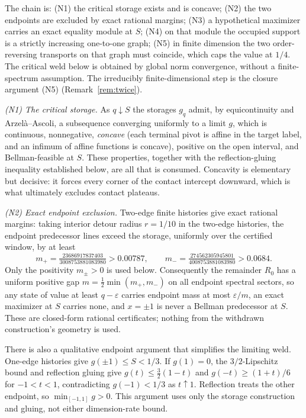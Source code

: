\documentclass[11pt]{article}
\theoremstyle{remark}
\begin{document}
The chain is: (N1) the critical storage exists and is concave; (N2) the two
endpoints are excluded by exact rational margins; (N3) a hypothetical
maximizer carries an exact equality module at $S$; (N4) on that module the
occupied support is a strictly increasing one-to-one graph; (N5) in finite
dimension the two order-reversing transports on that graph must coincide,
which caps the value at $1/4$. The critical weld below is obtained by
global norm convergence, without a finite-spectrum assumption. The
irreducibly finite-dimensional step is the closure argument (N5)
(Remark~\ref{rem:twice}).

\emph{(N1) The critical storage.} As $q\downarrow S$ the storages $g_q$ admit,
by equicontinuity and Arzel\`a--Ascoli, a subsequence converging uniformly to
a limit $g$, which is continuous, nonnegative, \emph{concave} (each terminal
pivot is affine in the target label, and an infimum of affine functions is
concave), positive on the open interval, and Bellman-feasible at $S$. These
properties, together with the reflection-gluing inequality established below,
are all that is consumed. Concavity is elementary but decisive:
it forces every corner of the contact intercept downward, which is what
ultimately excludes contact plateaus.

\emph{(N2) Exact endpoint exclusion.} Two-edge finite histories give exact
rational margins: taking interior detour radius $r=1/10$ in the two-edge
histories, the endpoint
predecessor lines exceed the storage, uniformly over the certified window, by
at least
\[
m_+=\tfrac{23686917837403}{3008753881083980}>0.00787,\qquad
m_-=\tfrac{274562305945801}{4008753881083980}>0.0684.
\]
Only the positivity $m_\pm>0$ is
used below. Consequently the remainder $R_0$ has a uniform positive gap
$m=\tfrac12\min(m_+,m_-)$ on all endpoint spectral sectors, so any state of value at
least $q-\varepsilon$ carries endpoint mass at most $\varepsilon/m$, an exact
maximizer at $S$ carries none, and $x=\pm1$ is never a Bellman predecessor at
$S$. These are
closed-form rational certificates; nothing from the withdrawn construction's
geometry is used.

There is also a qualitative endpoint argument that simplifies the limiting
weld. One-edge histories give $g(\pm1)\le S<1/3$. If $g(1)=0$, the
$3/2$-Lipschitz bound and reflection gluing give
$g(t)\le\tfrac32(1-t)$ and $g(-t)\ge(1+t)/6$ for $-1<t<1$,
contradicting $g(-1)<1/3$ as $t\uparrow1$. Reflection treats the other
endpoint, so $\min_{[-1,1]}g>0$. This argument uses only the storage
construction and gluing, not either dimension-rate bound.
\end{document}
